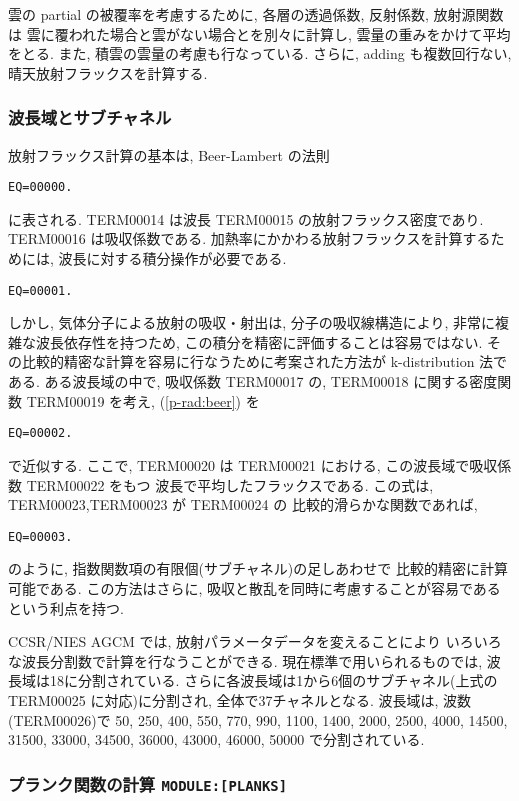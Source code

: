 雲の partial の被覆率を考慮するために,
各層の透過係数, 反射係数, 放射源関数は
雲に覆われた場合と雲がない場合とを別々に計算し,
雲量の重みをかけて平均をとる.
また, 積雲の雲量の考慮も行なっている.
さらに, adding も複数回行ない, 晴天放射フラックスを計算する.

\subsubsection{波長域とサブチャネル}

放射フラックス計算の基本は,
Beer-Lambert の法則
\begin{verbatim}
EQ=00000.
\end{verbatim}
に表される. TERM00014 は波長 TERM00015 の放射フラックス密度であり.
TERM00016 は吸収係数である.
加熱率にかかわる放射フラックスを計算するためには,
波長に対する積分操作が必要である.
%
\begin{verbatim}
EQ=00001.
\end{verbatim}
%
しかし, 気体分子による放射の吸収・射出は,
分子の吸収線構造により, 非常に複雑な波長依存性を持つため,
この積分を精密に評価することは容易ではない.
その比較的精密な計算を容易に行なうために考案された方法が
k-distribution 法である.
ある波長域の中で, 吸収係数 TERM00017 の,
TERM00018 に関する密度関数 TERM00019 を考え,
(\ref{p-rad:beer}) を
\begin{verbatim}
EQ=00002.
\end{verbatim}
で近似する. ここで, TERM00020 は
TERM00021 における, この波長域で吸収係数 TERM00022 をもつ
波長で平均したフラックスである.
この式は, TERM00023,TERM00023 が TERM00024 の
比較的滑らかな関数であれば, 
\begin{verbatim}
EQ=00003.
\end{verbatim}
のように, 指数関数項の有限個(サブチャネル)の足しあわせで
比較的精密に計算可能である.
この方法はさらに,
吸収と散乱を同時に考慮することが容易であるという利点を持つ.

CCSR/NIES AGCM では,
放射パラメータデータを変えることにより
いろいろな波長分割数で計算を行なうことができる.
現在標準で用いられるものでは,
波長域は18に分割されている.
さらに各波長域は1から6個のサブチャネル(上式の TERM00025 に対応)に分割され,
全体で37チャネルとなる.
波長域は, 波数(TERM00026)で
50, 250, 400, 550, 770, 990, 1100, 1400, 2000,
2500, 4000, 14500, 31500, 33000, 34500, 36000, 43000, 46000, 50000
で分割されている.

\subsubsection{プランク関数の計算 \texttt{MODULE:[PLANKS]}}

